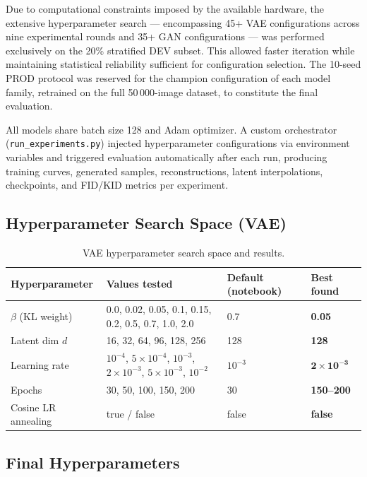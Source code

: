 \documentclass[runningheads]{llncs}
\begin{document}
Due to computational constraints imposed by the available hardware, the extensive hyperparameter search — encompassing 45+ VAE configurations across nine experimental rounds and 35+ GAN configurations — was performed exclusively on the 20\% stratified DEV subset. This allowed faster iteration while maintaining statistical reliability sufficient for configuration selection. The 10-seed PROD protocol was reserved for the champion configuration of each model family, retrained on the full 50\,000-image dataset, to constitute the final evaluation.

All models share batch size 128 and Adam optimizer. A custom orchestrator (\texttt{run\_experiments.py}) injected hyperparameter configurations via environment variables and triggered evaluation automatically after each run, producing training curves, generated samples, reconstructions, latent interpolations, checkpoints, and FID/KID metrics per experiment.

\subsection{Hyperparameter Search Space (VAE)}

\begin{table}[htbp]
\caption{VAE hyperparameter search space and results.}\label{tab:vae_search}
\centering
\begin{tabular}{llll}
\toprule
Hyperparameter & Values tested & Default (notebook) & Best found \\
\midrule
$\beta$ (KL weight) & 0.0, 0.02, 0.05, 0.1, 0.15, 0.2, 0.5, 0.7, 1.0, 2.0 & 0.7 & \textbf{0.05} \\
Latent dim $d$ & 16, 32, 64, 96, 128, 256 & 128 & \textbf{128} \\
Learning rate & $10^{-4}$, $5{\times}10^{-4}$, $10^{-3}$, $2{\times}10^{-3}$, $5{\times}10^{-3}$, $10^{-2}$ & $10^{-3}$ & $\mathbf{2{\times}10^{-3}}$ \\
Epochs & 30, 50, 100, 150, 200 & 30 & \textbf{150--200} \\
Cosine LR annealing & true / false & false & \textbf{false} \\
\bottomrule
\end{tabular}
\end{table}

\subsection{Final Hyperparameters}
\end{document}
